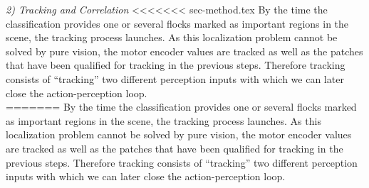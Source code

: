 %
\textit{2) Tracking and Correlation} \newline%
<<<<<<< sec-method.tex
By the time the classification provides one or several flocks marked as important regions in the scene, the tracking process launches.%
As this localization problem cannot be solved by pure vision, the motor encoder values are tracked as well as the patches that have been qualified for tracking in the previous steps. Therefore tracking consists of ``tracking'' two different perception inputs with which we can later close the action-perception loop.\\ \newline
=======
By the time the classification provides one or several flocks marked as important regions in the scene, the tracking process launches.%
As this localization problem cannot be solved by pure vision, the motor encoder values are tracked as well as the patches that have been qualified for tracking in the previous steps. Therefore tracking consists of ``tracking'' two different perception inputs with which we can later close the action-perception loop.
%

